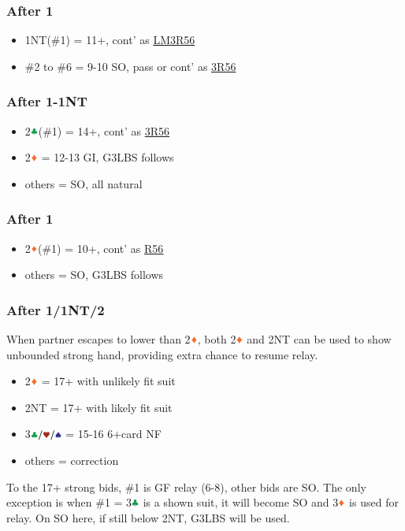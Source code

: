 \documentclass{article}
\begin{document}
\begin{multicols}{2}
\begin{CJK*}{UTF8}{gt}
\subsubsection{After 1\SSS}
\begin{itemize}
    \item 1NT(\#1) = 11+, cont' as \hyperref[sec:nlm3r56]{LM3R56}
    \item \#2 to \#6 = 9-10 SO, pass or cont' as \hyperref[sec:nlm3r56]{3R56}
\end{itemize}

\subsubsection{After 1\HHH-1NT}
\begin{itemize}
    \item 2$\ccc$(\#1) = 14+, cont' as \hyperref[sec:nlm3r56]{3R56}
    \item 2$\ddd$ = 12-13 GI, G3LBS follows
    \item others = SO, all natural
\end{itemize}

\subsubsection{After 1\CCC}
\begin{itemize}
    \item 2$\ddd$(\#1) = 10+, cont' as \hyperref[sec:nlm3r56]{R56}
    \item others = SO, G3LBS follows
\end{itemize}

\subsubsection{After 1\SSS/1NT/2\CCC}\label{sec:1d-escape}
When partner escapes to lower than 2$\ddd$, both 2$\ddd$ and 2NT can be used to show unbounded strong hand, providing extra chance to resume relay.
\begin{itemize}
    \item 2$\ddd$ = 17+ with unlikely fit suit
    \item 2NT = 17+ with likely fit suit
    \item 3$\ccc/\hhh/\sss$ = 15-16 6+card NF
    \item others = correction
\end{itemize}

\noindent To the 17+ strong bids, \#1 is GF relay (6-8), other bids are SO. The only exception is when \#1 = 3$\ccc$ is a shown suit, it will become SO and 3$\ddd$ is used for relay. On SO here, if still below 2NT, G3LBS will be used.


\end{CJK*}
\end{multicols}
\end{document}
